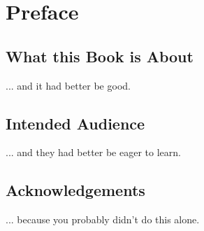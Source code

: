 \chapter*{Preface}\label{chap:preface}

\section*{What this Book is About}
... and it had better be good.

\section*{Intended Audience}
... and they had better be eager to learn.

\section*{Acknowledgements}
... because you probably didn't do this alone.
